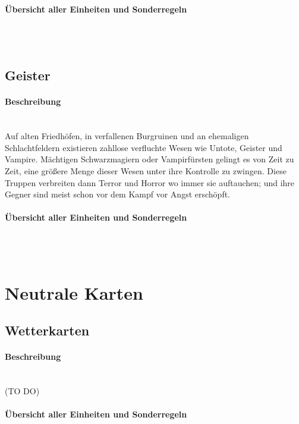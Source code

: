 \documentclass[a4paper,11pt]{report}
\begin{document}
\paragraph{Übersicht aller Einheiten und Sonderregeln}~\\
\\


\subsection{Geister}
\paragraph{Beschreibung}~\\
Auf alten Friedhöfen, in verfallenen Burgruinen und an ehemaligen Schlachtfeldern existieren zahllose verfluchte Wesen wie Untote, Geister und Vampire. Mächtigen Schwarzmagiern oder Vampirfürsten gelingt es von Zeit zu Zeit, eine größere Menge dieser Wesen unter ihre Kontrolle zu zwingen. Diese Truppen verbreiten dann Terror und Horror wo immer sie auftauchen; und ihre Gegner sind meist schon vor dem Kampf vor Angst erschöpft.

\paragraph{Übersicht aller Einheiten und Sonderregeln}~\\
\\


\section{Neutrale Karten}
\subsection{Wetterkarten}
\paragraph{Beschreibung}~\\
(TO DO)

\paragraph{Übersicht aller Einheiten und Sonderregeln}~\\
\\

\end{document}

